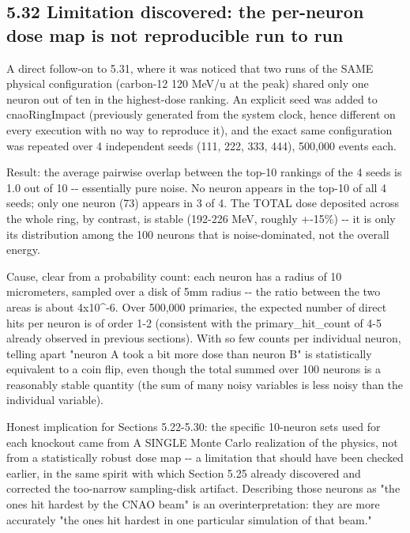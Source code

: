 \documentclass[
  english,
]{article}
\begin{document}



\subsection{5.32 Limitation discovered: the per-neuron dose map is not reproducible run to run}\label{limitation-discovered-the-per-neuron-dose-map-is-not-reproducible-run-to-run}

A direct follow-on to 5.31, where it was noticed that two runs of the SAME physical configuration (carbon-12 120 MeV/u at the peak) shared only one neuron out of ten in the highest-dose ranking. An explicit seed was added to cnaoRingImpact (previously generated from the system clock, hence different on every execution with no way to reproduce it), and the exact same configuration was repeated over 4 independent seeds (111, 222, 333, 444), 500,000 events each.

Result: the average pairwise overlap between the top-10 rankings of the 4 seeds is 1.0 out of 10 -\/- essentially pure noise. No neuron appears in the top-10 of all 4 seeds; only one neuron (73) appears in 3 of 4. The TOTAL dose deposited across the whole ring, by contrast, is stable (192-226 MeV, roughly +-15\%) -\/- it is only its distribution among the 100 neurons that is noise-dominated, not the overall energy.

Cause, clear from a probability count: each neuron has a radius of 10 micrometers, sampled over a disk of 5mm radius -\/- the ratio between the two areas is about 4x10\^{}-6. Over 500,000 primaries, the expected number of direct hits per neuron is of order 1-2 (consistent with the primary\_\allowbreak{}hit\_\allowbreak{}count of 4-5 already observed in previous sections). With so few counts per individual neuron, telling apart "neuron A took a bit more dose than neuron B" is statistically equivalent to a coin flip, even though the total summed over 100 neurons is a reasonably stable quantity (the sum of many noisy variables is less noisy than the individual variable).

Honest implication for Sections 5.22-5.30: the specific 10-neuron sets used for each knockout came from A SINGLE Monte Carlo realization of the physics, not from a statistically robust dose map -\/- a limitation that should have been checked earlier, in the same spirit with which Section 5.25 already discovered and corrected the too-narrow sampling-disk artifact. Describing those neurons as "the ones hit hardest by the CNAO beam" is an overinterpretation: they are more accurately "the ones hit hardest in one particular simulation of that beam."
\end{document}
